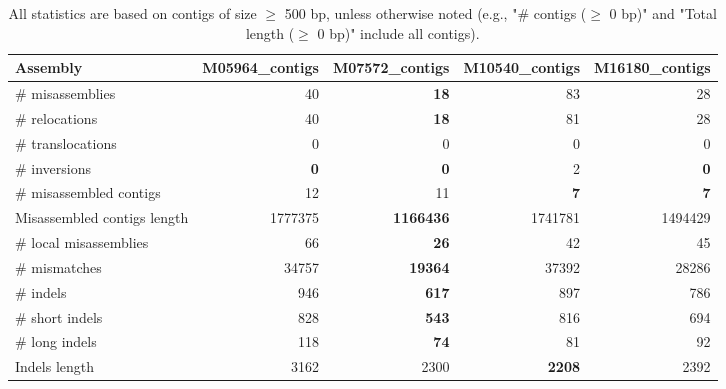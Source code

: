 \documentclass[12pt,a4paper]{article}
\begin{document}
\begin{table}[ht]
\begin{center}
\caption{All statistics are based on contigs of size $\geq$ 500 bp, unless otherwise noted (e.g., "\# contigs ($\geq$ 0 bp)" and "Total length ($\geq$ 0 bp)" include all contigs).}
\begin{tabular}{|l*{4}{|r}|}
\hline
Assembly & M05964\_contigs & M07572\_contigs & M10540\_contigs & M16180\_contigs \\ \hline
\# misassemblies & 40 & {\bf 18} & 83 & 28 \\ \hline
\hspace{5mm}\# relocations & 40 & {\bf 18} & 81 & 28 \\ \hline
\hspace{5mm}\# translocations & 0 & 0 & 0 & 0 \\ \hline
\hspace{5mm}\# inversions & {\bf 0} & {\bf 0} & 2 & {\bf 0} \\ \hline
\# misassembled contigs & 12 & 11 & {\bf 7} & {\bf 7} \\ \hline
Misassembled contigs length & 1777375 & {\bf 1166436} & 1741781 & 1494429 \\ \hline
\# local misassemblies & 66 & {\bf 26} & 42 & 45 \\ \hline
\# mismatches & 34757 & {\bf 19364} & 37392 & 28286 \\ \hline
\# indels & 946 & {\bf 617} & 897 & 786 \\ \hline
\hspace{5mm}\# short indels & 828 & {\bf 543} & 816 & 694 \\ \hline
\hspace{5mm}\# long indels & 118 & {\bf 74} & 81 & 92 \\ \hline
Indels length & 3162 & 2300 & {\bf 2208} & 2392 \\ \hline
\end{tabular}
\end{center}
\end{table}
\end{document}
